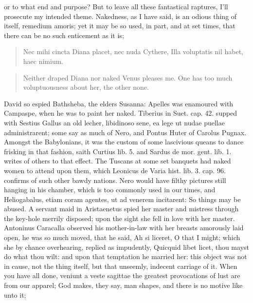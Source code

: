or to what end and purpose? But to leave all these fantastical
raptures, I'll prosecute my intended theme. Nakedness, as I have said,
is an odious thing of itself, remedium amoris; yet it may be so used,
in part, and at set times, that there can be no such enticement as it
is;

\begin{latin}
\begin{verse}%
Nec mihi cincta Diana placet, nec nuda Cythere,
Illa voluptatis nil habet, haec nimium.
\end{verse}%
\end{latin}
\translationrule%
\begin{verse}%
Neither draped Diana nor naked Venus pleases me.
One has too much voluptuousness about her, the other none.
\end{verse}%

David so espied Bathsheba, the elders Susanna: Apelles was
enamoured with Campaspe, when he was to paint her naked. Tiberius in
Suet. cap. 42. supped with Sestius Gallus an old lecher, libidinoso
sene, ea lege ut nudae puellae administrarent; some say as much of
Nero, and Pontus Huter of Carolus Pugnax. Amongst the Babylonians, it
was the custom of some lascivious queans to dance frisking in that
fashion, saith Curtius lib. 5. and Sardus de mor. gent. lib. 1. writes
of others to that effect. The Tuscans at some set banquets had
naked women to attend upon them, which Leonicus de Varia hist. lib. 3.
cap. 96. confirms of such other bawdy nations. Nero would have filthy
pictures still hanging in his chamber, which is too commonly used in
our times, and Heliogabalus, etiam coram agentes, ut ad venerem
incitarent: So things may be abused. A servant maid in Aristaenetus
spied her master and mistress through the key-hole merrily
disposed; upon the sight she fell in love with her master.
Antoninus Caracalla observed his mother-in-law with her breasts
amorously laid open, he was so much moved, that he said, Ah si liceret,
O that I might; which she by chance overhearing, replied as impudently,
Quicquid libet licet, thou mayst do what thou wilt: and upon that
temptation he married her: this object was not in cause, not the thing
itself, but that unseemly, indecent carriage of it.
When you have all done, veniunt a veste sagittae the greatest
provocations of lust are from our apparel; God makes, they say, man
shapes, and there is no motive like unto it;


